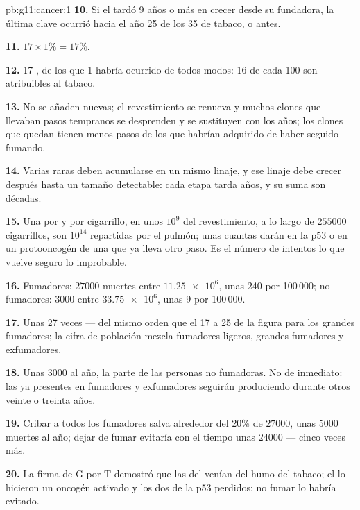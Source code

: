 \begin{solution}{pb:g11:cancer:1}
\textbf{10.} Si el  tardó 9 años o más en crecer desde su 
fundadora, la última  clave ocurrió hacia el año 25 de los 35
de tabaco, o antes.

\textbf{11.} $17 \times 1\% = 17\%$.

\textbf{12.} 17 , de los que 1 habría ocurrido de todos modos:
16 de cada 100 son atribuibles al tabaco.

\textbf{13.} No se añaden  nuevas; el revestimiento se
renueva y muchos clones que llevaban pasos tempranos se desprenden y se
sustituyen con los años; los clones que quedan tienen menos pasos de
los que habrían adquirido de haber seguido fumando.

\textbf{14.} Varias  raras deben acumularse en un mismo
linaje, y ese linaje debe crecer después hasta un tamaño detectable:
cada etapa tarda años, y su suma son décadas.

\textbf{15.} Una  por  y por cigarrillo, en unos $10^9$
 del revestimiento, a lo largo de $\num{255000}$ cigarrillos,
son $10^{14}$  repartidas por el pulmón; unas cuantas darán
en la p53 o en un protooncogén de una  que ya lleva otro paso. Es
el número de intentos lo que vuelve seguro lo improbable.

\textbf{16.} Fumadores: $\num{27000}$ muertes entre $\num{11.25e6}$,
unas 240 por 100\,000; no fumadores: 3000 entre $\num{33.75e6}$, unas 9
por 100\,000.

\textbf{17.} Unas 27 veces --- del mismo orden que el 17 a 25 de la
figura para los grandes fumadores; la cifra de población mezcla
fumadores ligeros, grandes fumadores y exfumadores.

\textbf{18.} Unas 3000 al año, la parte de las personas no fumadoras.
No de inmediato: las  ya presentes en fumadores y exfumadores
seguirán produciendo  durante otros veinte o treinta años.

\textbf{19.} Cribar a todos los fumadores salva alrededor del 20\% de
$\num{27000}$, unas 5000 muertes al año; dejar de fumar evitaría con el
tiempo unas $\num{24000}$ --- cinco veces más.

\textbf{20.} La firma de G por T demostró que las  del 
venían del humo del tabaco; el  lo hicieron un oncogén activado y
los dos  de la p53 perdidos; no fumar lo habría evitado.
\end{solution}
